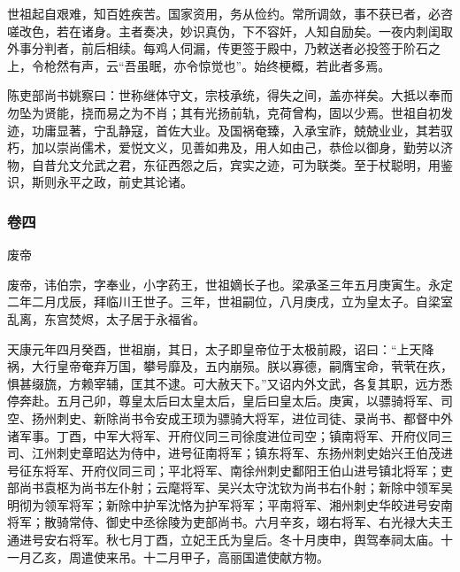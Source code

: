 \documentclass[]{article}
\begin{document}
世祖起自艰难，知百姓疾苦。国家资用，务从俭约。常所调敛，事不获已者，必咨嗟改色，若在诸身。主者奏决，妙识真伪，下不容奸，人知自励矣。一夜内刺闺取外事分判者，前后相续。每鸡人伺漏，传更签于殿中，乃敕送者必投签于阶石之上，令枪然有声，云``吾虽眠，亦令惊觉也''。始终梗概，若此者多焉。

陈吏部尚书姚察曰：世称继体守文，宗枝承统，得失之间，盖亦祥矣。大抵以奉而勿坠为贤能，挠而易之为不肖；其有光扬前轨，克荷曾构，固以少焉。世祖自初发迹，功庸显著，宁乱静寇，首佐大业。及国祸奄臻，入承宝祚，兢兢业业，其若驭朽，加以崇尚儒术，爱悦文义，见善如弗及，用人如由己，恭俭以御身，勤劳以济物，自昔允文允武之君，东征西怨之后，宾实之迹，可为联类。至于杖聪明，用鉴识，斯则永平之政，前史其论诸。

\hypertarget{header-n4218}{%
\subsubsection{卷四}\label{header-n4218}}

废帝

废帝，讳伯宗，字奉业，小字药王，世祖嫡长子也。梁承圣三年五月庚寅生。永定二年二月戊辰，拜临川王世子。三年，世祖嗣位，八月庚戌，立为皇太子。自梁室乱离，东宫焚烬，太子居于永福省。

天康元年四月癸酉，世祖崩，其日，太子即皇帝位于太极前殿，诏曰：``上天降祸，大行皇帝奄弃万国，攀号靡及，五内崩殒。朕以寡德，嗣膺宝命，茕茕在疚，惧甚缀旒，方赖宰辅，匡其不逮。可大赦天下。''又诏内外文武，各复其职，远方悉停奔赴。五月己卯，尊皇太后曰太皇太后，皇后曰皇太后。庚寅，以骠骑将军、司空、扬州刺史、新除尚书令安成王顼为骠骑大将军，进位司徒、录尚书、都督中外诸军事。丁酉，中军大将军、开府仪同三司徐度进位司空；镇南将军、开府仪同三司、江州刺史章昭达为侍中，进号征南将军；镇东将军、东扬州刺史始兴王伯茂进号征东将军、开府仪同三司；平北将军、南徐州刺史鄱阳王伯山进号镇北将军；吏部尚书袁枢为尚书左仆射；云麾将军、吴兴太守沈钦为尚书右仆射；新除中领军吴明彻为领军将军；新除中护军沈恪为护军将军；平南将军、湘州刺史华皎进号安南将军；散骑常侍、御史中丞徐陵为吏部尚书。六月辛亥，翊右将军、右光禄大夫王通进号安右将军。秋七月丁酉，立妃王氏为皇后。冬十月庚申，舆驾奉祠太庙。十一月乙亥，周遣使来吊。十二月甲子，高丽国遣使献方物。
\end{document}
